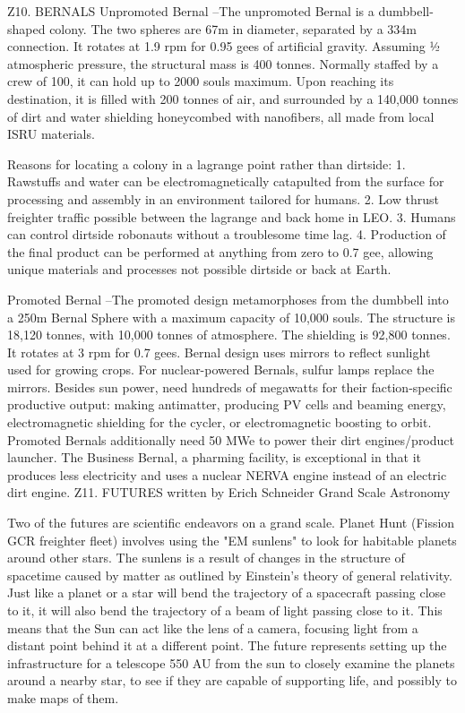 \documentclass[a4paper]{book}
\begin{document}
Z10. BERNALS
Unpromoted Bernal –The unpromoted Bernal is a dumbbell-shaped colony.  The two spheres are 67m in diameter, separated by a 334m connection.  It rotates at 1.9 rpm for 0.95 gees of artificial gravity. Assuming ½ atmospheric pressure, the structural mass is 400 tonnes.  Normally staffed by a crew of 100, it can hold up to 2000 souls maximum.  Upon reaching its destination, it is filled with 200 tonnes of air, and surrounded by a 140,000 tonnes of dirt and water shielding honeycombed with nanofibers, all made from local ISRU materials.
 
Reasons for locating a colony in a lagrange point rather than dirtside:
1.     Rawstuffs and water can  be electromagnetically catapulted from the surface for processing and assembly in an environment tailored for humans.
2.     Low thrust freighter traffic possible between the lagrange and back home in LEO.
3.     Humans can control dirtside robonauts without a troublesome time lag.
4.     Production of the final product can be performed at anything from zero to 0.7 gee, allowing unique materials and processes not possible dirtside or back at Earth.
 
Promoted Bernal –The promoted design metamorphoses from the dumbbell into a 250m Bernal Sphere with a maximum capacity of 10,000 souls. The structure is 18,120 tonnes, with 10,000 tonnes of atmosphere. The shielding is 92,800 tonnes. It rotates at 3 rpm for 0.7 gees. Bernal design uses mirrors to reflect sunlight used for growing crops. For nuclear-powered Bernals, sulfur lamps replace the mirrors. Besides sun power, need hundreds of megawatts for their faction-specific productive output: making antimatter, producing PV cells and beaming energy, electromagnetic shielding for the cycler, or electromagnetic boosting to orbit.  Promoted Bernals additionally need 50 MWe to power their dirt engines/product launcher.  The Business Bernal, a pharming facility, is exceptional in that it produces less electricity and uses a nuclear NERVA engine instead of an electric dirt engine.  
Z11. FUTURES written by Erich Schneider
Grand Scale Astronomy

Two of the futures are scientific endeavors on a grand scale. Planet Hunt (Fission GCR freighter fleet) involves using the "EM sunlens" to look for habitable planets around other stars. The sunlens is a result of changes in the structure of spacetime caused by matter as outlined by Einstein's theory of general relativity. Just like a planet or a star will bend the trajectory of a spacecraft passing close to it, it will also bend the trajectory of a beam of light passing close to it. This means that the Sun can act like the lens of a camera, focusing light from a distant point behind it at a different point. The future represents setting up the infrastructure for a telescope 550 AU from the sun to closely examine the planets around a nearby star, to see if they are capable of supporting life, and possibly to make maps of them.
\end{document}
